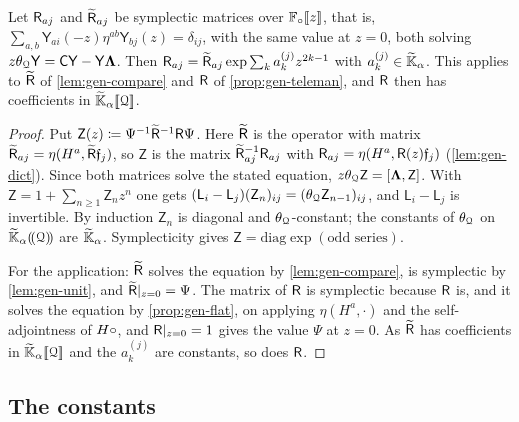 \begin{lem}[Ambiguity]
\label{lem:gen-ambig}
Let $\mathsf{R}_{aj}$ and $\widetilde{\mathsf{R}}_{aj}$ be symplectic matrices over $\mathbb{F}_{\circ}[\![ z ]\!]$, that is, $\sum_{a,b}\mathsf{Y}_{ai}(-z)\eta^{ab}\mathsf{Y}_{bj}(z)=\delta_{ij}$, with the same value at $z=0$, both solving $z\theta_{\mathcal{Q}}\mathsf{Y}=\mathsf{C}\mathsf{Y}-\mathsf{Y}\mathbf{\Lambda}$. Then $\mathsf{R}_{aj}=\widetilde{\mathsf{R}}_{aj}\exp\sum_ka_k^{(j)}z^{2k-1}$ with $a_k^{(j)}\in\widetilde{\mathbb{K}}_{\alpha}$. This applies to $\widetilde{\mathsf{R}}$ of \cref{lem:gen-compare} and $\mathsf{R}$ of \cref{prop:gen-teleman}, and $\mathsf{R}$ then has coefficients in $\widetilde{\mathbb{K}}_{\alpha}[\![ \mathcal{Q} ]\!]$.
\end{lem}
\begin{proof}
Put $\mathsf{Z}(z)\coloneqq\Psi^{-1}\widetilde{\mathsf{R}}^{-1}\mathsf{R}\Psi$. Here $\widetilde{\mathsf{R}}$ is the operator with matrix $\widetilde{\mathsf{R}}_{aj}=\eta(H^a,\widetilde{\mathsf{R}}\mathfrak{f}_j)$, so $\mathsf{Z}$ is the matrix $\widetilde{\mathsf{R}}_{aj}^{-1}\mathsf{R}_{aj}$ with $\mathsf{R}_{aj}=\eta(H^a,\mathsf{R}(z)\mathfrak{f}_j)$ (\cref{lem:gen-dict}). Since both matrices solve the stated equation, $z\theta_{\mathcal{Q}}\mathsf{Z}=[\mathbf{\Lambda},\mathsf{Z}]$. With $\mathsf{Z}=1+\sum_{n\geq1}\mathsf{Z}_nz^n$ one gets $(\mathsf{L}_i-\mathsf{L}_j)(\mathsf{Z}_n)_{ij}=(\theta_{\mathcal{Q}}\mathsf{Z}_{n-1})_{ij}$, and $\mathsf{L}_i-\mathsf{L}_j$ is invertible. By induction $\mathsf{Z}_n$ is diagonal and $\theta_{\mathcal{Q}}$-constant; the constants of $\theta_{\mathcal{Q}}$ on $\widetilde{\mathbb{K}}_{\alpha}(\!(\mathcal{Q})\!)$ are $\widetilde{\mathbb{K}}_{\alpha}$. Symplecticity gives $\mathsf{Z}=\mathrm{diag}\exp(\text{odd series})$.

For the application: $\widetilde{\mathsf{R}}$ solves the equation by \cref{lem:gen-compare}, is symplectic by \cref{lem:gen-unit}, and $\widetilde{\mathsf{R}}|_{z=0}=\Psi$. The matrix of $\mathsf{R}$ is symplectic because $\mathsf{R}$ is, and it solves the equation by \cref{prop:gen-flat}, on applying $\eta(H^a,\cdot)$ and the self-adjointness of $H\circ$, and $\mathsf{R}|_{z=0}=1$ gives the value $\Psi$ at $z=0$. As $\widetilde{\mathsf{R}}$ has coefficients in $\widetilde{\mathbb{K}}_{\alpha}[\![ \mathcal{Q} ]\!]$ and the $a_k^{(j)}$ are constants, so does $\mathsf{R}$.
\end{proof}

\subsection{The constants}


